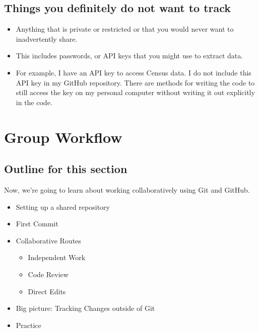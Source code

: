 \documentclass[
]{book}
\providecommand{\tightlist}{%
  \setlength{\itemsep}{0pt}\setlength{\parskip}{0pt}}
\begin{document}
\hypertarget{things-you-definitely-do-not-want-to-track}{%
\section{Things you definitely do not want to track}\label{things-you-definitely-do-not-want-to-track}}

\begin{itemize}
\tightlist
\item
  Anything that is private or restricted or that you would never want to
  inadvertently share.
\item
  This includes passwords, or API keys that you might use to extract data.
\item
  For example, I have an API key to access Census data. I do not include this
  API key in my GitHub repository. There are methods for writing the code to still
  access the key on my personal computer without writing it out explicitly in the
  code.
\end{itemize}

\hypertarget{group-workflow}{%
\chapter{Group Workflow}\label{group-workflow}}

\hypertarget{outline-for-this-section-1}{%
\section{Outline for this section}\label{outline-for-this-section-1}}

Now, we're going to learn about working collaboratively using Git and GitHub.

\begin{itemize}
\tightlist
\item
  Setting up a shared repository
\item
  First Commit
\item
  Collaborative Routes

  \begin{itemize}
  \tightlist
  \item
    Independent Work
  \item
    Code Review
  \item
    Direct Edits
  \end{itemize}
\item
  Big picture: Tracking Changes outside of Git
\item
  Practice
\end{itemize}
\end{document}
